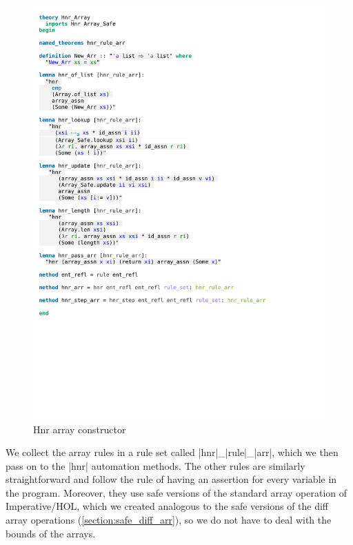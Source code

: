\begin{figure}[htpb]
    \includegraphics[trim={0 22,1cm 0 4,8cm}, clip, width=1.00\textwidth]{figures/Theory_Hnr_Array.pdf}
    \caption[Hnr array constructor]{Hnr array constructor}
    \label{fig:hnr_array_constructor}
\end{figure}

\noindent We collect the array rules in a rule set called |hnr|\_|rule|\_|arr|, which we then pass on to the |hnr| automation methods. The other rules are similarly straightforward and follow the rule of having an assertion for every variable in the program. Moreover, they use safe versions of the standard array operation of Imperative/HOL, which we created analogous to the safe versions of the diff array operations (\autoref{section:safe_diff_arr}), so we do not have to deal with the bounds of the arrays.

